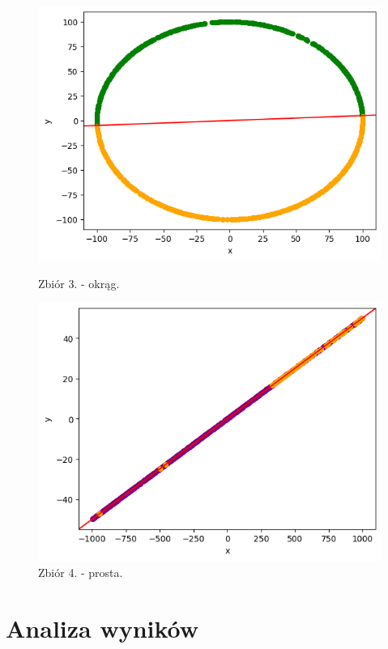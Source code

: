 \documentclass[11pt]{scrartcl}
\begin{document}
    \begin{figure}[H]
        \centering
        \begin{minipage}{0.4\linewidth}
          \centering
          \includegraphics[width=1\linewidth]{1_7.png}
          \caption{Zbiór 3. - okrąg.}
        \end{minipage}
        \begin{minipage}{0.4\linewidth}
          \centering
          \includegraphics[width=1\linewidth]{1_8.png}
          \caption{Zbiór 4. - prosta.}
        \end{minipage}
    \end{figure}



    \section{Analiza wyników}
\end{document}
